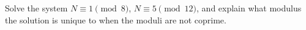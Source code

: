 Solve the system $N\equiv1\pmod8$, $N\equiv5\pmod{12}$, and explain what modulus the solution is unique to when the moduli are not coprime.
